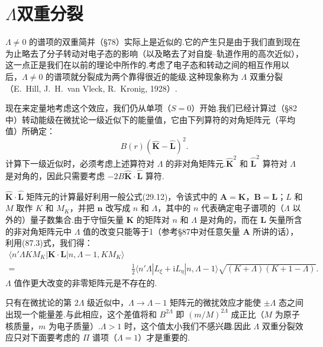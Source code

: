 \section{\texorpdfstring{$\Lambda$}{Λ}双重分裂}

$\Lambda\neq0$ 的谱项的双重简并（§78）实际上是近似的.它的产生只是由于我们直到现在为止略去了分子转动对电子态的影响（以及略去了对自旋–轨道作用的高次近似），这一点正是我们在以前的理论中所作的.考虑了电子态和转动之间的相互作用以后，$\Lambda\neq0$ 的谱项就分裂成为两个靠得很近的能级.这种现象称为 $\Lambda$ 双重分裂（E.~Hill, J.~H.~van Vleck, R.~Kronig, 1928）.

现在来定量地考虑这个效应，我们仍从单项（$S=0$）开始.我们已经计算过（§82中）转动能级在微扰论一级近似下的能量值，它由下列算符的对角矩阵元（平均值）所确定：
\begin{equation*}
  B(r)(\hat{\boldsymbol{K}}-\hat{\boldsymbol{L}})^2.
\end{equation*}
计算下一级近似时，必须考虑上述算符对 $\Lambda$ 的非对角矩阵元.$\hat{\boldsymbol{K}}^2$ 和 $\hat{\boldsymbol{L}}^2$ 算符对 $\Lambda$ 是对角的，因此只需要考虑 $-2B\hat{\boldsymbol{K}}\cdot\hat{\boldsymbol{L}}$ 算符.

$\hat{\boldsymbol{K}}\cdot\hat{\boldsymbol{L}}$ 矩阵元的计算最好利用一般公式(29.12)，令该式中的 $\boldsymbol{A}=\boldsymbol{K}$，$\boldsymbol{B}=\boldsymbol{L}$；$L$ 和 $M$ 取作 $K$ 和 $M_K$，并把 $\boldsymbol{n}$ 改写成 $n$ 和 $\Lambda$，其中的 $n$ 代表确定电子谱项的（$\Lambda$ 以外的）量子数集合.由于守恒矢量 $\boldsymbol{K}$ 的矩阵对 $n$ 和 $\Lambda$ 是对角的，而在 $\boldsymbol{L}$ 矢量所含的非对角矩阵元中 $\Lambda$ 值的改变只能等于1（参考§87中对任意矢量 $\boldsymbol{A}$ 所讲的话），利用(87.3)式，我们得：
\begin{equation}
\begin{aligned}
  \langle n'\Lambda KM_K|\boldsymbol{K}\cdot\boldsymbol{L}|n,\Lambda-1,KM_K\rangle&\\
  ={}&\frac{1}{2}\langle n'\Lambda|L_\xi+\mathrm{i}L_\eta|n,\Lambda-1\rangle
  \sqrt{(K+\Lambda)(K+1-\Lambda)}.
\end{aligned}
\end{equation}
$\Lambda$ 值作更大改变的非零矩阵元是不存在的.

只有在微扰论的第 $2\Lambda$ 级近似中，$\Lambda\to\Lambda-1$ 矩阵元的微扰效应才能使 $\pm\Lambda$ 态之间出现一个能量差.与此相应，这个差值将和 $B^{2\Lambda}$ 即 $(m/M)^{2\Lambda}$ 成正比（$M$ 为原子核质量，$m$ 为电子质量）.$\Lambda>1$ 时，这个值太小我们不感兴趣.因此 $\Lambda$ 双重分裂效应只对下面要考虑的 $\Pi$ 谱项（$\Lambda=1$）才是重要的.

